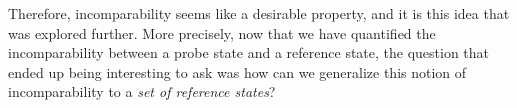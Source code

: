 Therefore, incomparability seems like a desirable property, and it is this idea that was explored further. More precisely, now that we have quantified the incomparability between a probe state and a reference state, the question that ended up being interesting to ask was how can we generalize this notion of incomparability to a \textit{set of reference states}?